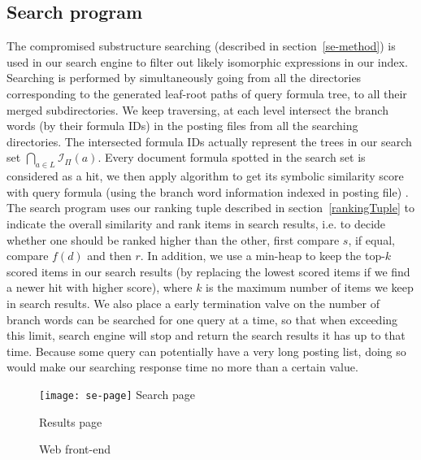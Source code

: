 \subsection{Search program}
\label{se-and-rank}
The compromised substructure searching (described in section~\ref{se-method}) is used in our search engine to filter out likely isomorphic expressions in our index.
Searching is performed by simultaneously going from all the directories corresponding to the generated leaf-root paths of query formula tree,
to all their merged subdirectories. 
We keep traversing, at each level intersect the branch words (by their formula IDs) in the posting files from all the searching directories. 
The intersected formula IDs actually represent the trees in our search set $\bigcap_{a \in L} \mathcal{I}_{\Pi}(a)$.
Every document formula spotted in the search set is considered as a hit, we then apply  algorithm to get its symbolic similarity score with query formula
(using the branch word information indexed in posting file)
.
The search program uses our ranking tuple described in section~\ref{rankingTuple} to indicate the overall similarity and rank items in search results,
i.e. to decide whether one should be ranked higher than the other, first compare $s$, if equal, compare $f(d)$ and then $r$.
In addition, we use a min-heap to keep the top-$k$ scored items in our search results (by replacing the lowest scored items if we find a newer hit with higher score), where $k$ is the maximum number of items we keep in search results.
We also place a early termination valve on the number of branch words can be searched for one query at a time,
so that when exceeding this limit, search engine will stop and return the search results it has up to that time. Because some query can potentially have a very long posting list, doing so would make our searching response time no more than a certain value.

\begin{figure}
\begin{minipage}[b]{2.65in}
\begin{center}
\texttt{[image: se-page]}
Search page
\end{center}
\end{minipage}
\hspace*{.38in}
\begin{minipage}[b]{2.65in}
\begin{center}
Results page
\end{center}
\end{minipage}
\caption{Web front-end}\label{frontEnd}
\end{figure}

